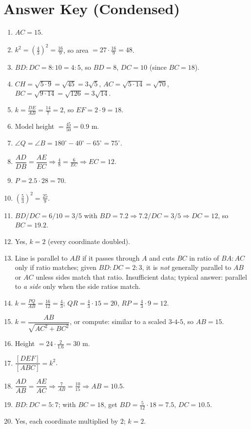 \documentclass[11pt,a4paper]{article}
\begin{document}
\section*{Answer Key (Condensed)}
\begin{enumerate}
  \item $AC=15$.
  \item $k^2=\left(\tfrac{4}{3}\right)^2=\tfrac{16}{9}$, so area $=27\cdot \tfrac{16}{9}=48$.
  \item $BD:DC=8:10=4:5$, so $BD=8$, $DC=10$ (since $BC=18$).
  \item $CH=\sqrt{5\cdot 9}=\sqrt{45}=3\sqrt{5}$, $AC=\sqrt{5\cdot 14}=\sqrt{70}$, $BC=\sqrt{9\cdot 14}=\sqrt{126}=3\sqrt{14}$.
  \item $k=\tfrac{DE}{AB}=\tfrac{14}{7}=2$, so $EF=2\cdot 9=18$.
  \item Model height $=\tfrac{45}{50}=0.9$ m.
  \item $\angle Q=\angle B=180^\circ-40^\circ-65^\circ=75^\circ$.
  \item $\dfrac{AD}{DB}=\dfrac{AE}{EC} \Rightarrow \tfrac{4}{8}=\tfrac{6}{EC} \Rightarrow EC=12$.
  \item $P=2.5\cdot 28=70$.
  \item $\left(\tfrac{5}{3}\right)^2=\tfrac{25}{9}$.
  \item $BD/DC=6/10=3/5$ with $BD=7.2 \Rightarrow 7.2/DC=3/5 \Rightarrow DC=12$, so $BC=19.2$.
  \item Yes, $k=2$ (every coordinate doubled).
  \item Line is parallel to $AB$ if it passes through $A$ and cuts $BC$ in ratio of $BA:AC$ only if ratio matches; given $BD:DC=2:3$, it is \emph{not} generally parallel to $AB$ or $AC$ unless sides match that ratio. Insufficient data; typical answer: parallel to \emph{a side} only when the side ratios match.
  \item $k=\tfrac{PQ}{AB}=\tfrac{16}{12}=\tfrac{4}{3}$; $QR=\tfrac{4}{3}\cdot 15=20$, $RP=\tfrac{4}{3}\cdot 9=12$.
  \item $k=\dfrac{AB}{\sqrt{AC^2+BC^2}}$, or compute: similar to a scaled $3$-$4$-$5$, so $AB=15$.
  \item Height $=24\cdot \tfrac{2}{1.6}=30$ m.
  \item $\dfrac{[DEF]}{[ABC]}=k^2$.
  \item $\dfrac{AD}{AB}=\dfrac{AE}{AC} \Rightarrow \tfrac{7}{AB}=\tfrac{10}{15} \Rightarrow AB=10.5$.
  \item $BD:DC=5:7$; with $BC=18$, get $BD=\tfrac{5}{12}\cdot 18=7.5$, $DC=10.5$.
  \item Yes, each coordinate multiplied by $2$; $k=2$.
\end{enumerate}
\end{document}
